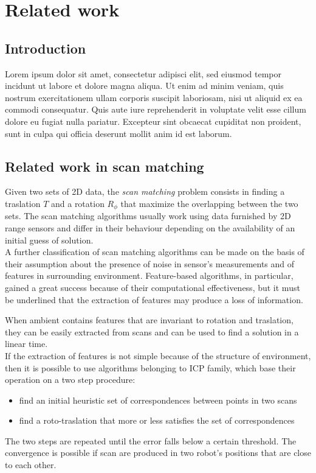 \documentclass[a4paper, onecolumn]{report}
\begin{document}
\chapter{Related work}
\section{Introduction}
Lorem ipsum dolor sit amet, consectetur adipisci elit, sed eiusmod tempor incidunt ut labore et dolore magna aliqua. Ut enim ad minim veniam, quis nostrum exercitationem ullam corporis suscipit laboriosam, nisi ut aliquid ex ea commodi consequatur. Quis aute iure reprehenderit in voluptate velit esse cillum dolore eu fugiat nulla pariatur. Excepteur sint obcaecat cupiditat non proident, sunt in culpa qui officia deserunt mollit anim id est laborum.

\section{Related work in scan matching}
Given two sets of 2D data, the \emph{scan matching} problem consists in finding a traslation $T$ and a rotation $R_\phi$ that maximize the overlapping between the two sets. The scan matching algorithms usually work using data furnished by 2D range sensors and differ in their behaviour depending on the availability of an initial guess of solution. \\
A further classification of scan matching algorithms can be made on the basis of their assumption about the presence of noise in sensor's measurements and of features in surrounding environment. Feature-based algorithms, in particular, gained a great success because of their computational effectiveness, but it must be underlined that the extraction of features may produce a loss of information. 

When ambient contains features that are invariant to rotation and traslation, they can be easily extracted from scans and can be used to find a solution in a linear time. \\
If the extraction of features is not simple because of the structure of environment, then it is possible to use algorithms belonging to ICP family, which base their operation on a two step procedure:
\begin{itemize}
	\item{find an initial heuristic set of correspondences between points in two scans}
	\item{find a roto-traslation that more or less satisfies the set of correspondences}
\end{itemize}
The two steps are repeated until the error falls below a certain threshold. The convergence is possible if scan are produced in two robot's positions that are close to each other.
\end{document}
